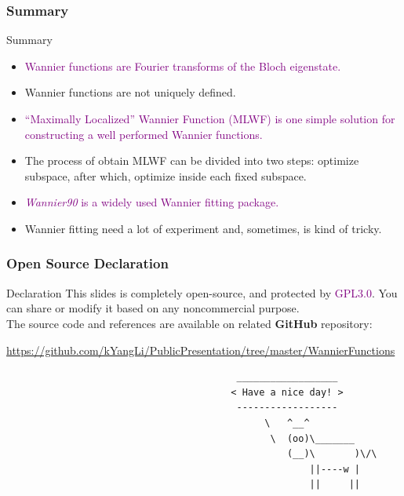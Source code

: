 \documentclass{beamer}
\begin{document}
  \begin{frame}
    \frametitle{Summary}
    \begin{block}{Summary}
      \begin{itemize}
        \item \textcolor{purple}{Wannier functions are Fourier transforms of the Bloch eigenstate.}
        \item Wannier functions are not uniquely defined.
        \item \textcolor{purple}{``Maximally Localized'' Wannier Function (MLWF) is one simple solution for constructing a well performed Wannier functions.}
        \item The process of obtain MLWF can be divided into two steps: optimize subspace, after which, optimize inside each fixed subspace.
        \item \textcolor{purple}{\emph{Wannier90} is a widely used Wannier fitting package.}
        \item Wannier fitting need a lot of experiment and, sometimes, is kind of tricky. 
      \end{itemize}
    \end{block}

  \end{frame}

  \begin{frame}[fragile]
    \frametitle{Open Source Declaration}
    \large
    \begin{block}{Declaration}
      This slides is completely open-source, and protected by \textcolor{purple}{GPL3.0}. You can share or modify it based on any noncommercial purpose.\\[5pt]

      The source code and references are available on related \textbf{GitHub} repository:
      
      \textcolor{purple}{\url{https://github.com/kYangLi/PublicPresentation/tree/master/WannierFunctions}}
    \end{block}
    \tiny
    \begin{verbatim}
                                         __________________
                                        < Have a nice day! >
                                         ------------------
                                              \   ^__^
                                               \  (oo)\_______
                                                  (__)\       )\/\
                                                      ||----w |
                                                      ||     || 
    \end{verbatim}
  \end{frame}
\end{document}
